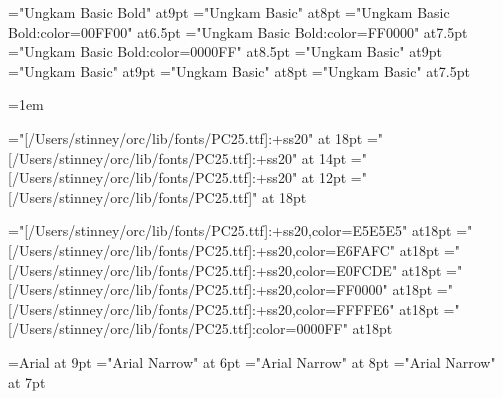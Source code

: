 

\font\slnmfont="Ungkam Basic Bold" at9pt
\font\sltgfont="Ungkam Basic" at8pt
\font\slnmfontw="Ungkam Basic Bold:color=00FF00" at6.5pt
\font\slnmfontx="Ungkam Basic Bold:color=FF0000" at7.5pt
\font\slnmfonty="Ungkam Basic Bold:color=0000FF" at8.5pt
\font\sldistfont="Ungkam Basic" at9pt
\font\oidfont="Ungkam Basic" at9pt
\font\oidfontx="Ungkam Basic" at8pt
\font\zatufont="Ungkam Basic" at7.5pt

\oidfont{}=1em \showthe{}

\font\pcssXX="[/Users/stinney/orc/lib/fonts/PC25.ttf]:+ss20" at 18pt
\font\pcssxx="[/Users/stinney/orc/lib/fonts/PC25.ttf]:+ss20" at 14pt
\font\pcssxxx="[/Users/stinney/orc/lib/fonts/PC25.ttf]:+ss20" at 12pt
\font\pcxviii="[/Users/stinney/orc/lib/fonts/PC25.ttf]" at 18pt

\font\pceee="[/Users/stinney/orc/lib/fonts/PC25.ttf]:+ss20,color=E5E5E5" at18pt
\font\pceff="[/Users/stinney/orc/lib/fonts/PC25.ttf]:+ss20,color=E6FAFC" at18pt
\font\pcefd="[/Users/stinney/orc/lib/fonts/PC25.ttf]:+ss20,color=E0FCDE" at18pt
\font\pcfee="[/Users/stinney/orc/lib/fonts/PC25.ttf]:+ss20,color=FF0000" at18pt
\font\pcffe="[/Users/stinney/orc/lib/fonts/PC25.ttf]:+ss20,color=FFFFE6" at18pt
\font\pcblu="[/Users/stinney/orc/lib/fonts/PC25.ttf]:color=0000FF" at18pt

\let\redpc\pcfee
\let\newgh\pcblu

\font\helv=Arial at 9pt
\font\helvx="Arial Narrow" at 6pt
\font\helvy="Arial Narrow" at 8pt
\font\helvz="Arial Narrow" at 7pt

\let\everymathextra\relax
\let\preamble\relax


\def\appendixstr{Appendix }


\let\seq\relax
\let\lname\relax
\let\sname\relax
\let\uname\relax
\let\chars\relax
\let\names\relax
\let\glyph\relax
\let\rglyf\relax
\let\image\relax
\let\notes\relax
\let\stags\relax

\let\sqdbcun\relax
\let\sqdbpua\relax
\let\sqseq\relax
\let\sqinv\relax
\let\sqchr\relax

\let\imagefloat\relax
\let\imagecaption\relax

\let\remfor\relax
\let\Hhhhh\relax

\def\unames{\eight\rm}

\def\ofs#1#2#3{}
\let\ofspc\pcxxv

